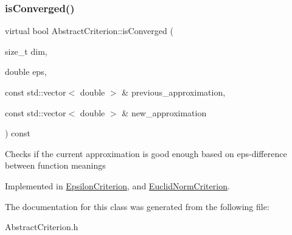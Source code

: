 \subsubsection{\texorpdfstring{is\+Converged()}{isConverged()}}
{\footnotesize\ttfamily virtual bool Abstract\+Criterion\+::is\+Converged (\begin{DoxyParamCaption}\item[{size\+\_\+t}]{dim,  }\item[{double}]{eps,  }\item[{const std\+::vector$<$ double $>$ \&}]{previous\+\_\+approximation,  }\item[{const std\+::vector$<$ double $>$ \&}]{new\+\_\+approximation }\end{DoxyParamCaption}) const\hspace{0.3cm}{\ttfamily [pure virtual]}}

Checks if the current approximation is good enough based on eps-\/difference between function meanings 

Implemented in \hyperlink{class_epsilon_criterion_a3e548b8cc84db57deb00708b1c361604}{Epsilon\+Criterion}, and \hyperlink{class_euclid_norm_criterion_a210c1396bb5ba2fab199f64eea3a8f76}{Euclid\+Norm\+Criterion}.



The documentation for this class was generated from the following file\+:\begin{DoxyCompactItemize}
\item 
Abstract\+Criterion.\+h\end{DoxyCompactItemize}
